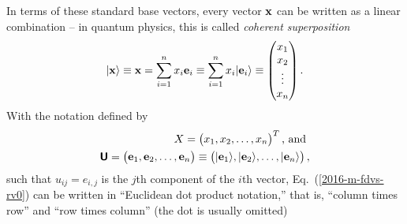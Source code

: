 In terms of these standard base vectors, every vector ${\bf x}$
can be written as a linear combination -- in quantum physics, this is called
{\em coherent superposition}
\begin{equation}
\vert {\bf x} \rangle \equiv {\bf x} = \sum_{i=1}^n x_i{\bf e}_i \equiv  \sum_{i=1}^n x_i \vert {\bf e}_i \rangle
\equiv
\begin{pmatrix}x_1\\x_2\\ \vdots \\ x_n\end{pmatrix}.
\label{2016-m-fdvs-rv0}
\end{equation}
With the notation
defined by
\begin{equation}
\begin{split} X = \begin{pmatrix}
x_1, x_2, \ldots , x_n
\end{pmatrix}^T
\textrm{, and }
\\
\textsf{\textbf{U}} =
\begin{pmatrix}{\bf e}_1,{\bf e}_2, \ldots , {\bf e}_n\end{pmatrix}
\equiv
\begin{pmatrix} \vert {\bf e}_1\rangle ,\vert {\bf e}_2 \rangle ,  \ldots , \vert {\bf e}_n\rangle \end{pmatrix}
,
\label{2016-m-fdvs-not}
\end{split}
\end{equation}
such that  $u_{ij} = e_{i,j}$ is the $j$th component of the $i$th vector,
Eq.~(\ref{2016-m-fdvs-rv0}) can be written
in ``Euclidean dot product notation,''
that is,
``column times row''
and
``row times column'' (the dot is usually omitted)
